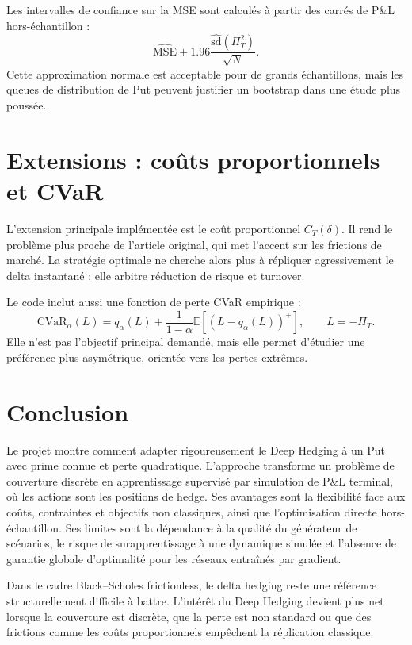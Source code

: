 \documentclass[11pt,a4paper]{article}
\begin{document}
Les intervalles de confiance sur la MSE sont calculés à partir des carrés de
P\&L hors-échantillon :
\[
\widehat{\mathrm{MSE}}\pm1.96
\frac{\widehat{\mathrm{sd}}(\Pi_T^2)}{\sqrt{N}}.
\]
Cette approximation normale est acceptable pour de grands échantillons, mais
les queues de distribution de Put peuvent justifier un bootstrap dans une étude
plus poussée.

\section{Extensions : coûts proportionnels et CVaR}

L'extension principale implémentée est le coût proportionnel
$C_T(\delta)$. Il rend le problème plus proche de l'article original, qui met
l'accent sur les frictions de marché. La stratégie optimale ne cherche alors
plus à répliquer agressivement le delta instantané : elle arbitre réduction de
risque et turnover.

Le code inclut aussi une fonction de perte CVaR empirique :
\[
\mathrm{CVaR}_\alpha(L)=q_\alpha(L)+
\frac{1}{1-\alpha}\mathbb{E}[(L-q_\alpha(L))^+],
\qquad L=-\Pi_T.
\]
Elle n'est pas l'objectif principal demandé, mais elle permet d'étudier une
préférence plus asymétrique, orientée vers les pertes extrêmes.

\section{Conclusion}

Le projet montre comment adapter rigoureusement le Deep Hedging à un Put avec
prime connue et perte quadratique. L'approche transforme un problème de
couverture discrète en apprentissage supervisé par simulation de P\&L terminal,
où les actions sont les positions de hedge. Ses avantages sont la flexibilité
face aux coûts, contraintes et objectifs non classiques, ainsi que
l'optimisation directe hors-échantillon. Ses limites sont la dépendance à la
qualité du générateur de scénarios, le risque de surapprentissage à une
dynamique simulée et l'absence de garantie globale d'optimalité pour les
réseaux entraînés par gradient.

Dans le cadre Black--Scholes frictionless, le delta hedging reste une référence
structurellement difficile à battre. L'intérêt du Deep Hedging devient plus net
lorsque la couverture est discrète, que la perte est non standard ou que des
frictions comme les coûts proportionnels empêchent la réplication classique.
\end{document}
